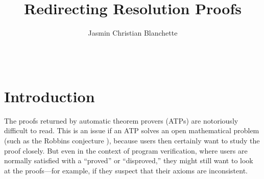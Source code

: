 \documentclass[withtimes,a4paper,12pt]{easychair}
\newcommand{\easychair}{\sf{easychair}}
\begin{document}
\title{Redirecting Resolution Proofs}




\author{
    Jasmin Christian Blanchette\\
    \\
    \\
}


\maketitle


\section{Introduction}
\label{sec:introduction}

The proofs returned by automatic theorem provers (ATPs) are notoriously
difficult to read. This is an issue if an ATP solves an open mathematical
problem (such as the Robbins conjecture \cite{mccune-1997}), because users then
certainly want to study the proof closely. But even in the context of program
verification, where users are normally satisfied with a ``proved'' or
``disproved,'' they might still want to look at the proofs---for example, if
they suspect that their axioms are inconsistent.
\end{document}
